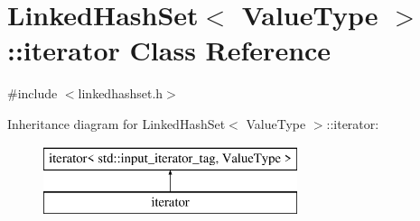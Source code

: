 \hypertarget{classLinkedHashSet_1_1iterator}{}\section{Linked\+Hash\+Set$<$ Value\+Type $>$\+:\+:iterator Class Reference}
\label{classLinkedHashSet_1_1iterator}


{\ttfamily \#include $<$linkedhashset.\+h$>$}

Inheritance diagram for Linked\+Hash\+Set$<$ Value\+Type $>$\+:\+:iterator\+:\begin{figure}[H]
\begin{center}
\leavevmode
\includegraphics[height=2.000000cm]{classLinkedHashSet_1_1iterator}
\end{center}
\end{figure}

